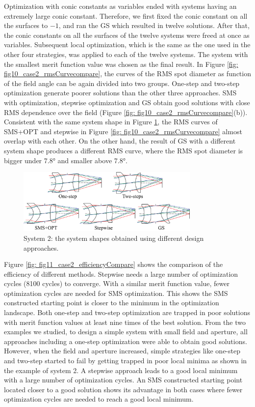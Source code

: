 Optimization with conic constants as variables ended with systems having an extremely large conic constant. Therefore, we first fixed the conic constant on all the surfaces to $-1$, and ran the GS which resulted in twelve solutions. After that, the conic constants on all the surfaces of the twelve systems were freed at once as variables. Subsequent local optimization, which is the same as the one used in the other four strategies, was applied to each of the twelve systems. The system with the smallest merit function value was chosen as the final result. In Figure \ref{fig: fig10_case2_rmsCurvecompare}, the curves of the RMS spot diameter as function of the field angle can be again divided into two groups. One-step and two-step optimization generate poorer solutions than the other three approaches. SMS with optimization, stepwise optimization and GS obtain good solutions with close RMS dependence over the field (Figure \ref{fig: fig10_case2_rmsCurvecompare}(b)). Consistent with the same system shape in Figure \ref{fig: fig9_case2_systems}, the RMS curves of SMS+OPT and stepwise in Figure \ref{fig: fig10_case2_rmsCurvecompare} almost overlap with each other. On the other hand, the result of GS with a different system shape produces a different RMS curve, where the RMS spot diameter is bigger under 7.8° and smaller above 7.8°.

\begin{figure}[h!]
    \centering
    \includegraphics[width=0.8\textwidth]{chapter-5/figures/Figure9_system2_solutions.png}
    \caption{System 2: the system shapes obtained using different design approaches.}
    \label{fig: fig9_case2_systems}
\end{figure}

Figure \ref{fig: fig11_case2_efficiencyCompare} shows the comparison of the efficiency of different methods. Stepwise needs a large number of optimization cycles (8100 cycles) to converge. With a similar merit function value, fewer optimization cycles are needed for SMS optimization. This shows the SMS constructed starting point is closer to the minimum in the optimization landscape. Both one-step and two-step optimization are trapped in poor solutions with merit function values at least nine times of the best solution. 
From the two examples we studied, to design a simple system with small field and aperture, all approaches including a one-step optimization were able to obtain good solutions. However, when the field and aperture increased, simple strategies like one-step and two-step started to fail by getting trapped in poor local minima as shown in the example of system 2. A stepwise approach leads to a good local minimum with a large number of optimization cycles. An SMS constructed starting point located closer to a good solution shows its advantage in both cases where fewer optimization cycles are needed to reach a good local minimum.

